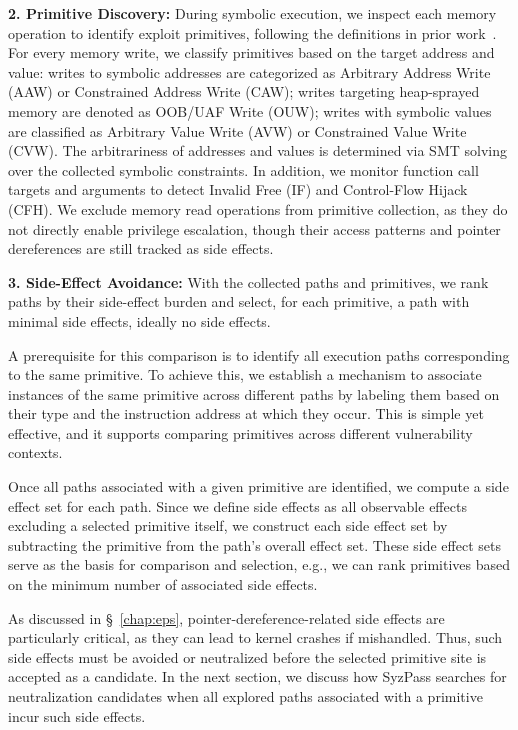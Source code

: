 \noindent\textbf{2. Primitive Discovery:} During symbolic execution, we inspect each memory operation to identify exploit primitives, following the definitions in prior work~\cite{zou2022syzscope}.
For every memory write, we classify primitives based on the target address and value: writes to symbolic addresses are categorized as Arbitrary Address Write (AAW) or Constrained Address Write (CAW); writes targeting heap-sprayed memory are denoted as OOB/UAF Write (OUW); writes with symbolic values are classified as Arbitrary Value Write (AVW) or Constrained Value Write (CVW). The arbitrariness of addresses and values is determined via SMT solving over the collected symbolic constraints.
In addition, we monitor function call targets and arguments to detect Invalid Free (IF) and Control-Flow Hijack (CFH).
We exclude memory read operations from primitive collection, as they do not directly enable privilege escalation, though their access patterns and pointer dereferences are still tracked as side effects. 

\noindent\textbf{3. Side-Effect Avoidance:} With the collected paths and primitives, we rank paths by their side-effect burden and select, for each primitive, a path with minimal side effects, ideally no side effects.

A prerequisite for this comparison is to identify all execution paths corresponding to the same primitive. To achieve this, we establish a mechanism to associate instances of the same primitive across different paths by labeling them based on their type and the instruction address at which they occur. This is simple yet effective, and it supports comparing primitives across different vulnerability contexts.

Once all paths associated with a given primitive are identified, we compute a side effect set for each path. Since we define side effects as all observable effects excluding a selected primitive itself, we construct each side effect set by subtracting the primitive
from the path's overall effect set. These side effect sets serve as the basis for comparison and selection, e.g., we can rank primitives based on the minimum number of associated side effects.

As discussed in \S~\ref{chap:eps}, pointer-dereference-related side effects are particularly critical, as they can lead to kernel crashes if mishandled. Thus, such side effects must be avoided or neutralized before the selected primitive site is accepted as a candidate. In the next section, we discuss how SyzPass searches for neutralization candidates when all explored paths associated with a primitive incur such side effects.

